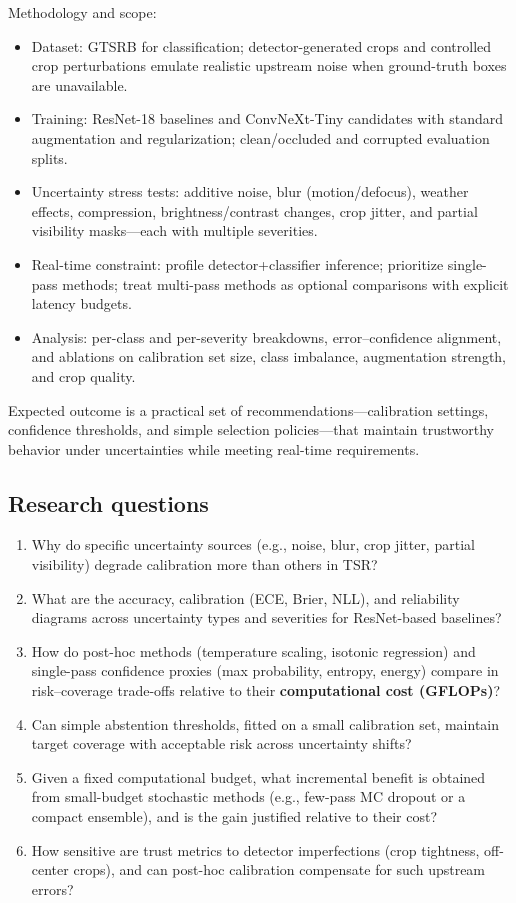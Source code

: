 \documentclass[11pt,a4paper]{article}
\begin{document}
Methodology and scope:
\begin{itemize}
  \item Dataset: GTSRB for classification; detector-generated crops and controlled crop perturbations emulate realistic upstream noise when ground-truth boxes are unavailable.
  \item Training: ResNet-18 baselines and ConvNeXt-Tiny candidates with standard augmentation and regularization; clean/occluded and corrupted evaluation splits.
  \item Uncertainty stress tests: additive noise, blur (motion/defocus), weather effects, compression, brightness/contrast changes, crop jitter, and partial visibility masks—each with multiple severities.
  \item Real-time constraint: profile detector+classifier inference; prioritize single-pass methods; treat multi-pass methods as optional comparisons with explicit latency budgets.
  \item Analysis: per-class and per-severity breakdowns, error–confidence alignment, and ablations on calibration set size, class imbalance, augmentation strength, and crop quality.
\end{itemize}

Expected outcome is a practical set of recommendations—calibration settings, confidence thresholds, and simple selection policies—that maintain trustworthy behavior under uncertainties while meeting real-time requirements.

\subsection{Research questions}

\begin{enumerate}[label=\arabic*.]
  \item Why do specific uncertainty sources (e.g., noise, blur, crop jitter, partial visibility) degrade calibration more than others in TSR?
  \item What are the accuracy, calibration (ECE, Brier, NLL), and reliability diagrams across uncertainty types and severities for ResNet-based baselines?
  \item How do post-hoc methods (temperature scaling, isotonic regression) and single-pass confidence proxies (max probability, entropy, energy) compare in risk--coverage trade-offs relative to their \textbf{computational cost (GFLOPs)}?
  \item Can simple abstention thresholds, fitted on a small calibration set, maintain target coverage with acceptable risk across uncertainty shifts?
  \item Given a fixed computational budget, what incremental benefit is obtained from small-budget stochastic methods (e.g., few-pass MC dropout or a compact ensemble), and is the gain justified relative to their cost?
  \item How sensitive are trust metrics to detector imperfections (crop tightness, off-center crops), and can post-hoc calibration compensate for such upstream errors?
\end{enumerate}
\end{document}

